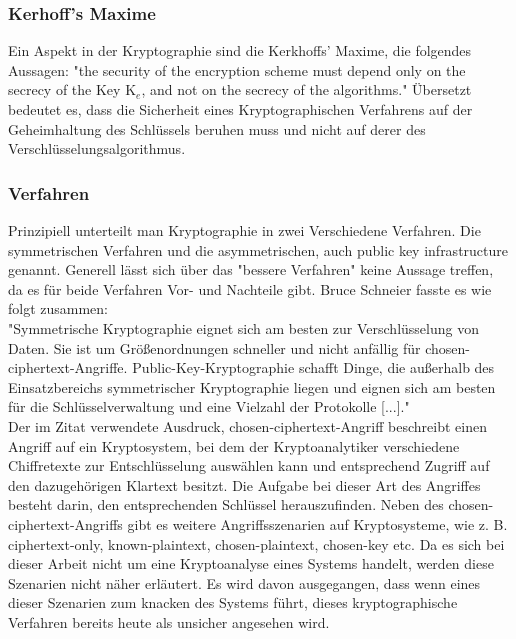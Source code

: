 \documentclass[10pt, a4paper,headsepline]{scrreprt}
\begin{document}
\subsubsection{Kerhoff's Maxime}
Ein Aspekt in der Kryptographie sind die Kerkhoffs' Maxime, die folgendes Aussagen: "the security of the encryption scheme must depend only on the secrecy of the Key K$_{e}$, and not on the secrecy of the algorithms." \citep[S. 23]{book:practical-crypto} Übersetzt bedeutet es, dass die Sicherheit eines Kryptographischen Verfahrens  auf der Geheimhaltung des Schlüssels beruhen muss und nicht auf derer des Verschlüsselungsalgorithmus.


\subsubsection{Verfahren}
Prinzipiell unterteilt man Kryptographie in zwei Verschiedene Verfahren. Die symmetrischen Verfahren und die asymmetrischen, auch public key infrastructure genannt. Generell lässt sich über das "bessere Verfahren" keine Aussage treffen, da es für beide Verfahren Vor- und Nachteile gibt. Bruce Schneier fasste es wie folgt zusammen: \\
"Symmetrische Kryptographie eignet sich am besten zur Verschlüsselung von Daten. Sie ist um Größenordnungen schneller und nicht anfällig für chosen-ciphertext-Angriffe. Public-Key-Kryptographie schafft Dinge, die außerhalb des Einsatzbereichs symmetrischer Kryptographie liegen und eignen sich am besten für die Schlüsselverwaltung und eine Vielzahl der Protokolle [...]." \citep[S. 254f]{book:angewandte-krypto} \\ 
Der im Zitat verwendete Ausdruck, chosen-ciphertext-Angriff beschreibt einen Angriff auf ein Kryptosystem, bei dem der Kryptoanalytiker verschiedene Chiffretexte zur Entschlüsselung auswählen kann und entsprechend Zugriff auf den dazugehörigen Klartext besitzt. Die Aufgabe bei dieser Art des Angriffes besteht darin, den entsprechenden Schlüssel herauszufinden. \citep[S. 7]{book:angewandte-krypto}
Neben des chosen-ciphertext-Angriffs gibt es weitere Angriffsszenarien auf Kryptosysteme, wie z. B. ciphertext-only, known-plaintext, chosen-plaintext, chosen-key etc. Da es sich bei dieser Arbeit nicht um eine Kryptoanalyse eines Systems handelt, werden diese Szenarien nicht näher erläutert. Es wird davon ausgegangen, dass wenn eines dieser Szenarien zum knacken des Systems führt, dieses kryptographische Verfahren bereits heute als unsicher angesehen wird.
\end{document}
